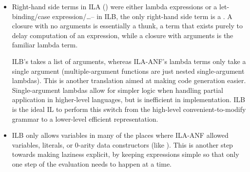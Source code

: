 \documentclass[dissertation.tex]{subfiles}
\begin{document}
{{\begin{itemize}
{            \begin{haskellfigure}
            data Pair a b = Pair a b
            x = Pair 1
            y = x 2
            \end{haskellfigure}

            At the implementation level however, functions and data constructors are necessarily very different, so
            distinguishing them within this IL makes code generation easier.


        }
        \item
        {

            Right-hand side terms in ILA () were either lambda expressions or a let-binding/case
            expression/\dots -- in ILB, the only right-hand side term is a . A closure with no
            arguments is essentially a thunk, a term that exists purely to delay computation of an expression, while
            a closure with arguments is the familiar lambda term.

            ILB's  takes a list of arguments, whereas ILA-ANF's lambda terms only take a single
            argument (multiple-argument functions are just nested single-argument lambdas). This is another
            translation aimed at making code generation easier. Single-argument lambdas allow for simpler logic when
            handling partial application in higher-level languages, but is inefficient in implementation. ILB is the
            ideal IL to perform this switch from the high-level convenient-to-modify grammar to a lower-level
            efficient representation.

        }
        \item
        {

            ILB only allows variables in many of the places where ILA-ANF allowed variables, literals, or 0-arity
            data constructors (like ). This is another step towards making laziness explicit, by
            keeping expressions simple so that only one step of the evaluation needs to happen at a time.

        }
        \end{itemize}

    }
}
\end{document}
